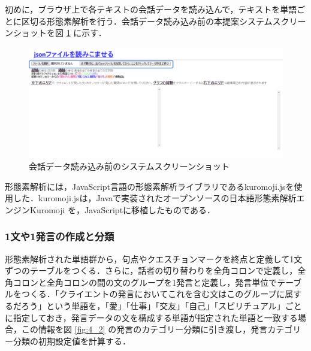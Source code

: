 \documentclass[shuuron]{kuee}
\begin{document}
初めに，ブラウザ上で各テキストの会話データを読み込んで，テキストを単語ごとに区切る形態素解析を行う．会話データ読み込み前の本提案システムスクリーンショットを図
\ref{fig:yomikomimae2}
に示す．
\begin{figure}
  \begin{center}
    \includegraphics[width=\linewidth]{yomikomimae2.png}
  \end{center}
  \caption{会話データ読み込み前のシステムスクリーンショット}
  \label{fig:yomikomimae2}
\end{figure}
形態素解析には，JavaScript言語の形態素解析ライブラリであるkuromoji.js\cite{kuromojijs}を使用した．kuromoji.jsは，Javaで実装されたオープンソースの日本語形態素解析エンジンKuromoji
\cite{kuromoji}
を，JavaScriptに移植したものである．

\subsubsection{1文や1発言の作成と分類}%
形態素解析された単語群から，句点やクエスチョンマークを終点と定義して1文ずつのテーブルをつくる．さらに，話者の切り替わりを全角コロンで定義し，全角コロンと全角コロンの間の文のグループを1発言と定義し，発言単位でテーブルをつくる．「クライエントの発言においてこれを含む文はこのグループに属するだろう」という単語を，「愛」「仕事」「交友」「自己」「スピリチュアル」ごとに指定しておき，発言データの文を構成する単語が指定された単語と一致する場合，この情報を図
\ref{fig:4_2}
の発言のカテゴリー分類に引き渡し，発言カテゴリー分類の初期設定値を計算する．


\end{document}
